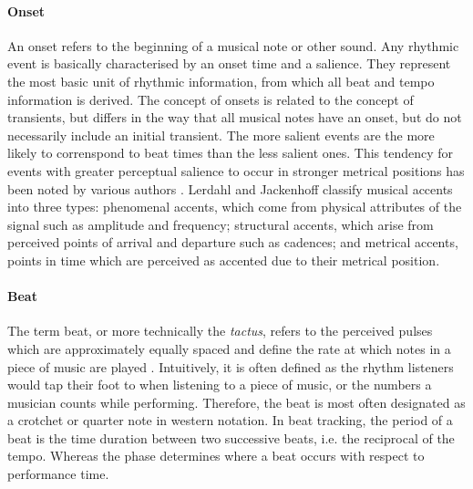 \documentclass{scrartcl}
\begin{document}
\paragraph{Onset} 
An onset refers to the beginning of a musical note or other sound. Any rhythmic event is basically characterised by an onset time and a salience. They represent the most basic unit of rhythmic information, from which all beat and tempo information is derived. The concept of onsets is related to the concept of transients, but differs in the way that all musical notes have an onset, but do not necessarily include an initial transient. The more salient events are the more likely to correnspond to beat times than the less salient ones. This tendency for events with greater perceptual salience to occur in stronger metrical positions has been noted by various authors \cite{Lerdahl1985,Povel1985,Parncutt1994}. Lerdahl and Jackenhoff \cite{Lerdahl1985} classify musical accents into three types: phenomenal accents, which come from physical attributes of the signal such as amplitude and frequency; structural accents, which arise from perceived points of arrival and departure such as cadences; and metrical accents, points in time which are perceived as accented due to their metrical position.


\paragraph{Beat} 
The term beat, or more technically the \emph{tactus}, refers to the perceived pulses which are approximately equally spaced and define the rate at which notes in a piece of music are played \cite{Handel1989}. Intuitively, it is often defined as the rhythm listeners would tap their foot to when listening to a piece of music, or the numbers a musician counts while performing. Therefore, the beat is most often designated as a crotchet or quarter note in western notation. In beat tracking, the period of a beat is the time duration between two successive beats, i.e. the reciprocal of the tempo. Whereas the phase determines where a beat occurs with respect to performance time.
\end{document}
